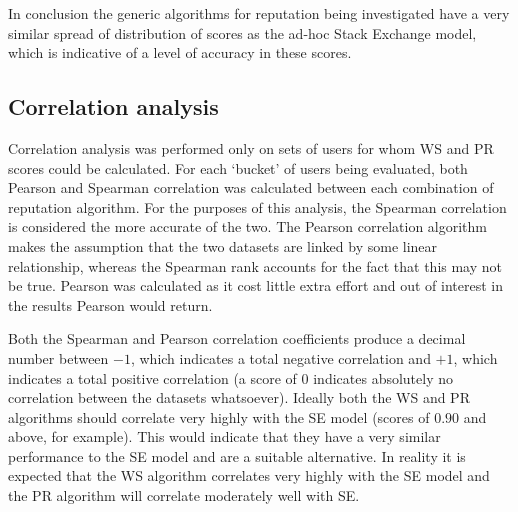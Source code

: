 \documentclass[]{final_report}
\begin{document}
In conclusion the generic algorithms for reputation being investigated have a very similar spread of distribution of scores as the ad-hoc Stack Exchange model, which is indicative of a level of accuracy in these scores.

\subsection{Correlation analysis}


Correlation analysis was performed only on sets of users for whom WS and PR scores could be calculated. For each `bucket' of users being evaluated, both Pearson and Spearman correlation was calculated between each combination of reputation algorithm. For the purposes of this analysis, the Spearman correlation is considered the more accurate of the two. The Pearson correlation algorithm makes the assumption that the two datasets are linked by some linear relationship, whereas the Spearman rank accounts for the fact that this may not be true. Pearson was calculated as it cost little extra effort and out of interest in the results Pearson would return.

Both the Spearman and Pearson correlation coefficients produce a decimal number between $-1$, which indicates a total negative correlation and $+1$, which indicates a total positive correlation (a score of $0$ indicates absolutely no correlation between the datasets whatsoever). Ideally both the WS and PR algorithms should correlate very highly with the SE model (scores of $0.90$ and above, for example). This would indicate that they have a very similar performance to the SE model and are a suitable alternative. In reality it is expected that the WS algorithm correlates very highly with the SE model and the PR algorithm will correlate moderately well with SE.
\end{document}
